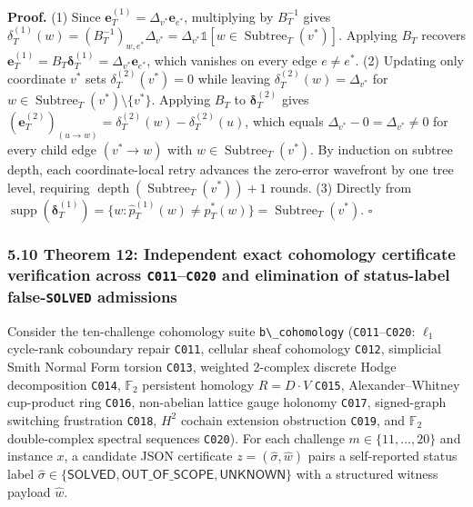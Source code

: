 \documentclass[
  11pt,
]{article}
\newcommand{\passthrough}[1]{#1}
\begin{document}
\textbf{Proof.} (1) Since
\(\mathbf{e}_T^{(1)} = \Delta_{v^*} \mathbf{e}_{e^*}\), multiplying by
\(B_T^{-1}\) gives
\(\delta_T^{(1)}(w) = (B_T^{-1})_{w,\allowbreak  e^*} \Delta_{v^*} = \Delta_{v^*} \mathbb{1}[w \in \operatorname{Subtree}_T(v^*)]\).
Applying \(B_T\) recovers
\(\mathbf{e}_T^{(1)} = B_T \boldsymbol{\delta}_T^{(1)} = \Delta_{v^*} \mathbf{e}_{e^*}\),
which vanishes on every edge \(e \ne e^*\). (2) Updating only coordinate
\(v^*\) sets \(\delta_T^{(2)}(v^*) = 0\) while leaving
\(\delta_T^{(2)}(w) = \Delta_{v^*}\) for
\(w \in \operatorname{Subtree}_T(v^*) \setminus \{v^*\}\). Applying
\(B_T\) to \(\boldsymbol{\delta}_T^{(2)}\) gives
\((\mathbf{e}_T^{(2)})_{(u \to w)} = \delta_T^{(2)}(w) - \delta_T^{(2)}(u)\),
which equals \(\Delta_{v^*} - 0 = \Delta_{v^*} \ne 0\) for every child
edge \((v^* \to w)\) with \(w \in \operatorname{Subtree}_T(v^*)\). By
induction on subtree depth, each coordinate-local retry advances the
zero-error wavefront by one tree level, requiring
\(\operatorname{depth}(\operatorname{Subtree}_T(v^*)) + 1\) rounds. (3)
Directly from
\(\operatorname{supp}(\boldsymbol{\delta}_T^{(1)}) = \{w : \hat{p}_T^{(1)}(w) \ne p_T^*(w)\} = \operatorname{Subtree}_T(v^*)\).
\(\square\)

\subsubsection{\texorpdfstring{5.10 Theorem 12: Independent exact
cohomology certificate verification across \texttt{C011}--\texttt{C020}
and elimination of status-label false-\texttt{SOLVED}
admissions}{5.10 Theorem 12: Independent exact cohomology certificate verification across C011--C020 and elimination of status-label false-SOLVED admissions}}\label{theorem-12-independent-exact-cohomology-certificate-verification-across-c011c020-and-elimination-of-status-label-false-solved-admissions}

Consider the ten-challenge cohomology suite
\passthrough{\lstinline!b\_cohomology!}
(\passthrough{\lstinline!C011!}--\passthrough{\lstinline!C020!}:
\(\ell_1\) cycle-rank coboundary repair \passthrough{\lstinline!C011!},
cellular sheaf cohomology \passthrough{\lstinline!C012!}, simplicial
Smith Normal Form torsion \passthrough{\lstinline!C013!}, weighted
2-complex discrete Hodge decomposition \passthrough{\lstinline!C014!},
\(\mathbb{F}_2\) persistent homology \(R = D \cdot V\)
\passthrough{\lstinline!C015!}, Alexander--Whitney cup-product ring
\passthrough{\lstinline!C016!}, non-abelian lattice gauge holonomy
\passthrough{\lstinline!C017!}, signed-graph switching frustration
\passthrough{\lstinline!C018!}, \(H^2\) cochain extension obstruction
\passthrough{\lstinline!C019!}, and \(\mathbb{F}_2\) double-complex
spectral sequences \passthrough{\lstinline!C020!}). For each challenge
\(m \in \{11,\allowbreak  \dots,\allowbreak  20\}\) and instance \(x\),
a candidate JSON certificate \(z = (\hat{\sigma},\allowbreak  \hat{w})\)
pairs a self-reported status label
\(\hat{\sigma} \in \{\mathsf{SOLVED},\allowbreak  \mathsf{OUT\_OF\_SCOPE},\allowbreak  \mathsf{UNKNOWN}\}\)
with a structured witness payload \(\hat{w}\).
\end{document}
